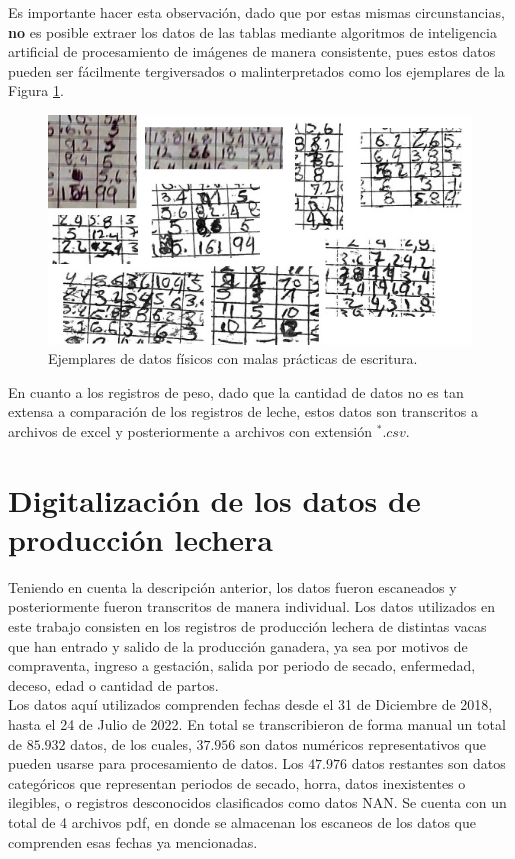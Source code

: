 Es importante hacer esta observación, dado que por estas mismas circunstancias, \textbf{no} es posible extraer los datos de las tablas mediante algoritmos de inteligencia artificial de procesamiento de imágenes de manera consistente, pues estos datos pueden ser fácilmente tergiversados o malinterpretados como los ejemplares de la Figura \ref{datosamanopng}.

\begin{figure}[H]
	 \begin{center}
	 \includegraphics[scale=1.05]{img/datosamano.jpg}
	 \end{center}
	 \caption{Ejemplares de datos físicos con malas prácticas de escritura. \label{datosamanopng}}
\end{figure}

En cuanto a los registros de peso, dado que la cantidad de datos no es tan extensa a comparación de los registros de leche, estos datos son transcritos a archivos de excel y posteriormente a archivos con extensión $^{*}.csv$.

\section{Digitalización de los datos de producción lechera}

Teniendo en cuenta la descripción anterior, los datos fueron escaneados y posteriormente fueron transcritos de manera individual. Los datos utilizados en este trabajo consisten en los registros de producción lechera de distintas vacas que han entrado y salido de la producción ganadera, ya sea por motivos de compraventa, ingreso a gestación, salida por periodo de secado,  enfermedad, deceso, edad o cantidad de partos.\\

Los datos aquí utilizados comprenden fechas desde el 31 de Diciembre de 2018, hasta el 24 de Julio de 2022. En total se transcribieron de forma manual un total de $85.932$  datos, de los cuales, $37.956$ son datos numéricos representativos que pueden usarse para procesamiento de datos. Los $47.976$ datos restantes son datos categóricos que representan periodos de secado, horra, datos inexistentes o ilegibles, o registros desconocidos clasificados como datos NAN. Se cuenta con un total de 4 archivos pdf, en donde se almacenan los escaneos de los datos que comprenden esas fechas ya mencionadas.\\


